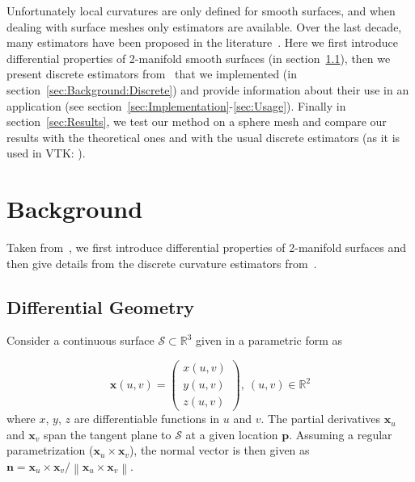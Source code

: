 \documentclass{InsightArticle}
\def \Surface {\mathcal{S}}
\def \Rset {\mathbb{R}}
\theoremstyle{plain}
\begin{document}
Unfortunately local curvatures are only defined for smooth surfaces, and when dealing with surface meshes only estimators are available. Over the last decade, many estimators have been proposed in the literature~\cite{MeshCourse07}. Here we first introduce differential properties of 2-manifold smooth surfaces (in section~\ref{sec:Background:Smooth}), then we present discrete estimators from~\cite{Meyer02} that we implemented (in section~\ref{sec:Background:Discrete}) and provide information about their use in an application (see section~\ref{sec:Implementation}-\ref{sec:Usage}). Finally in section~\ref{sec:Results}, we test our method on a sphere mesh and compare our results with the theoretical ones and with the usual discrete estimators (as it is used in VTK: ).

\section{Background}
\label{sec:Background}

Taken from~\cite{MeshCourse07}, we first introduce differential properties of 2-manifold surfaces and then give details from the discrete curvature estimators from~\cite{Meyer02}.

\subsection{Differential Geometry}
\label{sec:Background:Smooth}

Consider a continuous surface $\Surface \subset \Rset^3$ given in a parametric form as

\begin{equation}
  \mathbf{x}(u,v)=
\left(
  \begin{array}{c}
    x(u,v)\\
    y(u,v)\\
    z(u,v)
  \end{array}
\right),\ (u,v)\in \Rset^2
\end{equation}
where $x$, $y$, $z$ are differentiable functions in $u$ and $v$. The partial derivatives $\mathbf{x}_u$ and $\mathbf{x}_v$ span the tangent plane to $\Surface$ at a given location $\mathbf{p}$. Assuming a regular parametrization ($\mathbf{x}_u \times \mathbf{x}_v$), the normal vector is then given as $\mathbf{n} = \mathbf{x}_u \times \mathbf{x}_v / \left\| \mathbf{x}_u \times \mathbf{x}_v \right\|$.
\end{document}
